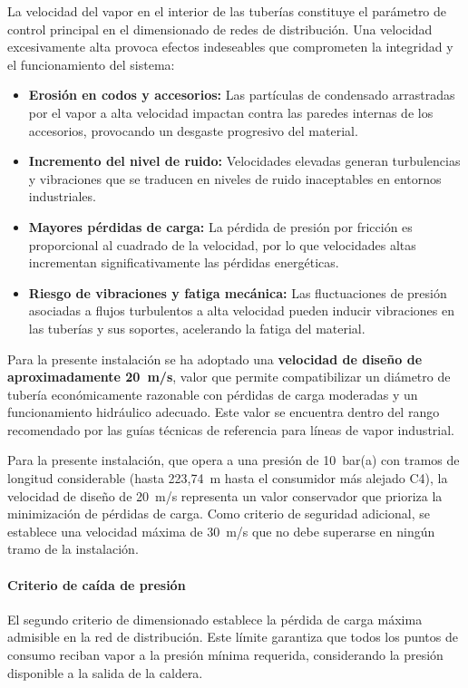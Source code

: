 \documentclass[12pt]{article}
\begin{document}
La velocidad del vapor en el interior de las tuberías constituye el parámetro de control principal en el dimensionado de redes de distribución. Una velocidad excesivamente alta provoca efectos indeseables que comprometen la integridad y el funcionamiento del sistema:

\begin{itemize}[leftmargin=2em]
	\item \textbf{Erosión en codos y accesorios:} Las partículas de condensado arrastradas por el vapor a alta velocidad impactan contra las paredes internas de los accesorios, provocando un desgaste progresivo del material.
	\item \textbf{Incremento del nivel de ruido:} Velocidades elevadas generan turbulencias y vibraciones que se traducen en niveles de ruido inaceptables en entornos industriales.
	\item \textbf{Mayores pérdidas de carga:} La pérdida de presión por fricción es proporcional al cuadrado de la velocidad, por lo que velocidades altas incrementan significativamente las pérdidas energéticas.
	\item \textbf{Riesgo de vibraciones y fatiga mecánica:} Las fluctuaciones de presión asociadas a flujos turbulentos a alta velocidad pueden inducir vibraciones en las tuberías y sus soportes, acelerando la fatiga del material.
\end{itemize}

Para la presente instalación se ha adoptado una \textbf{velocidad de diseño de aproximadamente 20~m/s}, valor que permite compatibilizar un diámetro de tubería económicamente razonable con pérdidas de carga moderadas y un funcionamiento hidráulico adecuado. Este valor se encuentra dentro del rango recomendado por las guías técnicas de referencia para líneas de vapor industrial.

Para la presente instalación, que opera a una presión de 10~bar(a) con tramos de longitud considerable (hasta 223,74~m hasta el consumidor más alejado C4), la velocidad de diseño de 20~m/s representa un valor conservador que prioriza la minimización de pérdidas de carga. Como criterio de seguridad adicional, se establece una velocidad máxima  de 30~m/s que no debe superarse en ningún tramo de la instalación.

\paragraph{Criterio de caída de presión}

El segundo criterio de dimensionado establece la pérdida de carga máxima admisible en la red de distribución. Este límite garantiza que todos los puntos de consumo reciban vapor a la presión mínima requerida, considerando la presión disponible a la salida de la caldera.
\end{document}
